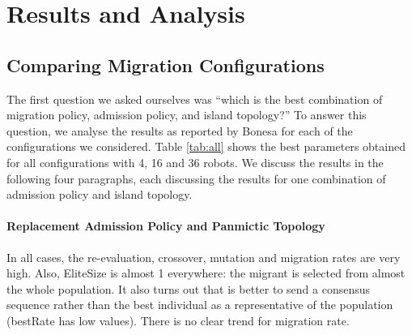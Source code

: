 \documentclass[runningheads]{llncs}
\begin{document}


\section{Results and Analysis}
\label{sec:results}

\subsection{Comparing Migration Configurations}
The first question we asked ourselves was ``which is the best combination of migration policy, admission policy, and island topology?'' To answer this question, we analyse the results as reported by Bonesa for each of the configurations we considered. Table \ref{tab:all} shows the best parameters obtained for all configurations with 4, 16 and 36 robots.  We discuss the results in the following four paragraphs, each discussing the results for one combination of admission policy and island topology.

\paragraph{Replacement Admission Policy and Panmictic Topology}

In all cases, the re-evaluation, crossover, mutation and migration rates are very high. Also, EliteSize is almost 1 everywhere: the migrant is selected from almost the whole population. It also turns out that is better to send a consensus sequence rather than the best individual as a representative of the population (bestRate has low values). 
There is no clear trend for migration rate.
\end{document}
